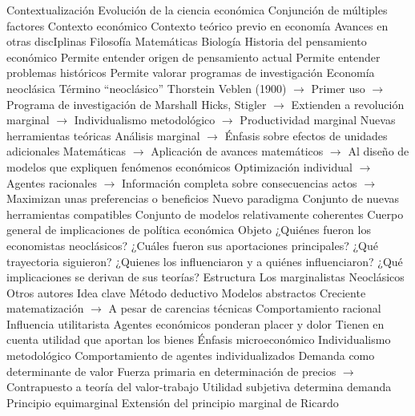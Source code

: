 \documentclass{nuevotema}
\begin{document}
\esquemalargo

\begin{esquemal}
	\1[] 
		\2 Contextualización
			\3 Evolución de la ciencia económica
				\4 Conjunción de múltiples factores
				\4 Contexto económico
				\4 Contexto teórico previo en economía
				\4 Avances en otras discIplinas
				\4[] Filosofía
				\4[] Matemáticas
				\4[] Biología
			\3 Historia del pensamiento económico
				\4 Permite entender origen de pensamiento actual
				\4 Permite entender problemas históricos
				\4 Permite valorar programas de investigación
			\3 Economía neoclásica
				\4 Término ``neoclásico''
				\4[] Thorstein Veblen (1900)
				\4[] $\to$ Primer uso
				\4[] $\to$ Programa de investigación de Marshall
				\4[] Hicks, Stigler
				\4[] $\to$ Extienden a revolución marginal
				\4[] $\to$ Individualismo metodológico
				\4[] $\to$ Productividad marginal
				\4 Nuevas herramientas teóricas
				\4[] Análisis marginal
				\4[] $\to$ Énfasis sobre efectos de unidades adicionales
				\4[] Matemáticas
				\4[] $\to$ Aplicación de avances matemáticos
				\4[] $\to$ Al diseño de modelos que expliquen fenómenos económicos
				\4[] Optimización individual
				\4[] $\to$ Agentes racionales
				\4[] $\to$ Información completa sobre consecuencias actos
				\4[] $\to$ Maximizan unas preferencias o beneficios
				\4 Nuevo paradigma
				\4[] Conjunto de nuevas herramientas compatibles
				\4[] Conjunto de modelos relativamente coherentes
				\4[] Cuerpo general de implicaciones de política económica
		\2 Objeto
			\3 ¿Quiénes fueron los economistas neoclásicos?
			\3 ¿Cuáles fueron sus aportaciones principales?
			\3 ¿Qué trayectoria siguieron?
			\3 ¿Quienes los influenciaron y a quiénes influenciaron?
			\3 ¿Qué implicaciones se derivan de sus teorías?
		\2 Estructura
			\3 Los marginalistas
			\3 Neoclásicos
			\3 Otros autores
	\1 
		\2 Idea clave
			\3 Método deductivo
				\4 Modelos abstractos
				\4 Creciente matematización
				\4[] $\to$ A pesar de carencias técnicas
			\3 Comportamiento racional
				\4 Influencia utilitarista
				\4 Agentes económicos ponderan placer y dolor
				\4 Tienen en cuenta utilidad que aportan los bienes
			\3 Énfasis microeconómico
				\4 Individualismo metodológico
				\4 Comportamiento de agentes individualizados
			\3 Demanda como determinante de valor
				\4 Fuerza primaria en determinación de precios
				\4[] $\to$ Contrapuesto a teoría del valor-trabajo
				\4 Utilidad subjetiva determina demanda
			\3 Principio equimarginal
				\4 Extensión del principio marginal de Ricardo

\end{esquemal}
\end{document}
